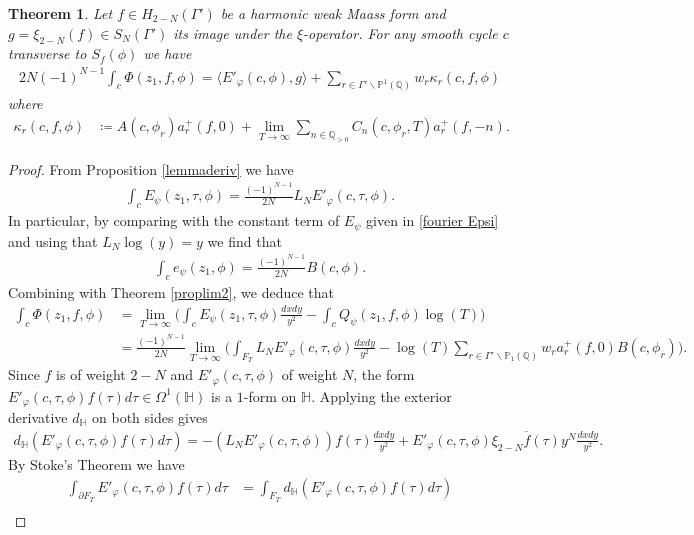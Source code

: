 \documentclass[twoside,a4paper,10pt]{article} %
\newcommand{\dxdy}{\frac{dxdy}{y^2}}
\newcommand{\8}{\infty}
\newcommand{\HH}{\mathbb{H}}
\newcommand{\Q}{\mathbb{Q}}
\newcommand{\PP}{\mathbb{P}}
\theoremstyle{mytheoremstyle}
\newtheorem{thm}{Theorem}[section]
\theoremstyle{remark}
\numberwithin{equation}{section}
\begin{document}
\begin{thm}\label{main formula 1}Let $f \in H_{2-N}(\Gamma')$ be a harmonic weak Maass form and $g=\xi_{2-N}(f) \in S_N(\Gamma')$ its image under the $\xi$-operator. For any smooth cycle $c$ transverse to $S_f(\phi)$ we have 
\begin{align}
2N (-1)^{N-1}\int_{c}\Phi(z_1,f,\phi) =  \langle E'_\varphi(c,\phi),g \rangle+ \sum_{ r \in \Gamma' \backslash \PP^1(\Q)}w_r \kappa_r(c,f,\phi)
\end{align}
where
\begin{align}
\kappa_r(c,f,\phi) & \coloneqq A(c,\phi_r)a^+_r(f,0)  + \lim_{T \rightarrow \8}\sum_{n \in \Q_{>0}}C_n(c,\phi_r,T)  a^+_r(f,-n).
\end{align}
\end{thm}
\begin{proof} 
From Proposition \ref{lemmaderiv} we have
\begin{align}
\int_{c}E_{\psi}(z_1,\tau,\phi)= \frac{(-1)^{N-1}}{2N} L_N E'_\varphi(c,\tau,\phi).
\end{align}
In particular, by comparing with the constant term of $E_\psi$ given in \eqref{fourier Epsi} and using that $L_N\log(y)=y$ we find that
\begin{align}
\int_ce_\psi(z_1,\phi)= \frac{(-1)^{N-1}}{2N} B(c,\phi).
\end{align}
Combining with Theorem \ref{proplim2}, we deduce that
\begin{align} \label{intermediate equality}
\int_{c}\Phi(z_1,f,\phi) & = \lim_{T\rightarrow \8} \bigg( \int_{c}E_{\psi}(z_1,\tau,\phi) \dxdy -\int_cQ_\psi(z_1,f,\phi) \log(T) \bigg) \\
& = \frac{(-1)^{N-1}}{2N} \lim_{T\rightarrow \8} \bigg( \int_{F_T} L_N E'_\varphi(c,\tau,\phi) \dxdy - \log(T) \sum_{r \in \Gamma' \backslash \PP_1(\Q)}w_r a^+_r(f,0) B(c,\phi_r) \bigg).
\end{align}
Since $f$ is of weight $2-N$ and $E'_\varphi(c,\tau,\phi)$ of weight $N$, the form $E'_\varphi(c,\tau,\phi)f(\tau)d\tau \in \Omega^1(\HH)$ is a $1$-form on $\HH$. Applying the exterior derivative $d_\HH$ on both sides gives
\begin{align}
d_\HH \left (E'_\varphi(c,\tau,\phi)f(\tau)d\tau \right )=-(L_NE'_\varphi(c,\tau,\phi))f(\tau)\dxdy+E'_\varphi(c,\tau,\phi)\overline{\xi_{2-N}f(\tau)}y^N\dxdy.
\end{align}
By Stoke's Theorem we have
\begin{align}
\int_{\partial F_T} E'_\varphi(c,\tau,\phi)f(\tau)d\tau & =\int_{F_T}d_\HH \left (E'_\varphi(c,\tau,\phi)f(\tau)d\tau \right ) \\

\end{align}
\end{proof}
\end{document}
